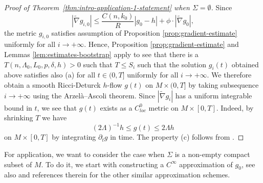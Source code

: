 \documentclass[12pt]{amsart}
\newcommand{\hdel}{\tilde{\nabla}}
\theoremstyle{remark}
\numberwithin{equation}{section}
\begin{document}
\begin{proof}[Proof of Theorem~\ref{thm:intro-application-1-statement} when $\Sigma=\emptyset$]
Since 
\begin{equation}
|\hdel g_{i,0}|\leq \frac{C(n,k_0)}{R}|g_0-h|+\phi\cdot |\hdel g_0|,
\end{equation}
the metric $g_{i,0}$ satisfies assumption of  Proposition \ref{prop:gradient-estimate} uniformly for all $i\to+\infty$. Hence, Proposition \ref{prop:gradient-estimate} and Lemmas \ref{lem:estimates-bootstrap} apply to see that there is a $T(n, \Lambda_0, L_0, p, \delta,h) > 0$ such that  $T \leq S_i$ such that the solution $g_i(t)$ obtained above satisfies also (a) for all $t \in (0, T]$ uniformly for all $i\to+\infty$. We therefore obtain a smooth Ricci-Deturck $h$-flow $g(t)$ on $M\times (0,T]$ by taking subsequence $i\to+\infty$ using  the Arzel\`a--Ascoli theorem. Since $|\hdel g_i|$ has a uniform integrable bound in $t$, we see that $g(t)$ exists as a $C^0_{loc}$ metric on $M\times [0,T]$. Indeed, by shrinking $T$ we have 
\begin{equation}
(2\Lambda)^{-1}h\leq g(t)\leq 2\Lambda h
\end{equation}
on $M\times [0,T]$ by integrating $\partial_t g$ in time. The property (c) follows from \cite[Proposition 2.2]{chu_ricci-deturck_2022}.
\end{proof}


For application, we want to consider the case when $\Sigma$ is a non-empty compact subset of $M$. To do it, we start with constructing a $C^\infty$ approximation of $g_0$, see also \cite{lee_positive_2013,shi_scalar_2016,
lee_continuous_2021,grant_positive_2014} and references therein for the other similar approximation schemes.
\end{document}

